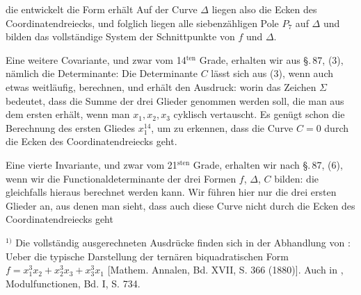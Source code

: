 die entwickelt die Form erhält
Auf der Curve $\Delta$ liegen also die Ecken des Coordinatendreiecks,
und folglich liegen alle siebenzähligen Pole $P_7$ auf $\Delta$ und
bilden das vollständige System der Schnittpunkte von $f$ und $\Delta$.

Eine weitere Covariante, und zwar vom 14$^{\mathrm{ten}}$ Grade,
erhalten wir aus \S.\,87, (3), nämlich die Determinante:
Die Determinante $C$ lässt sich aus (3), wenn auch etwas weitläufig,
berechnen, und erhält den Ausdruck:
worin das Zeichen $\Sigma$ bedeutet, dass die Summe der drei Glieder
genommen werden soll, die man aus dem ersten erhält, wenn man
$x_1, x_2, x_3$ cyklisch vertauscht. Es genügt schon die Berechnung
des ersten Gliedes $x_1^{14}$, um zu erkennen, dass die Curve $C = 0$
 durch die Ecken des Coordinatendreiecks geht.

Eine vierte Invariante, und zwar vom 21$^{\mathrm{sten}}$ Grade,
erhalten wir nach \S.\,87, (6), wenn wir die Functionaldeterminante
der drei Formen $f$, $\Delta$, $C$ bilden:
die gleichfalls hieraus berechnet werden kann. Wir führen hier nur die
drei ersten Glieder an, aus denen man sieht, dass auch diese Curve
nicht durch die Ecken des Coordinatendreiecks geht

$^{1)}$ Die vollständig ausgerechneten Ausdrücke finden sich in der
Abhandlung von : \glqq Ueber die typische Darstellung
der ternären biquadratischen Form $f = x_1^3x_2 + x_2^3x_3 + x_3^3x_1$\grqq{}
[Mathem. Annalen, Bd. XVII, S. 366 (1880)]. Auch in ,
Modulfunctionen, Bd. I, S. 734.
